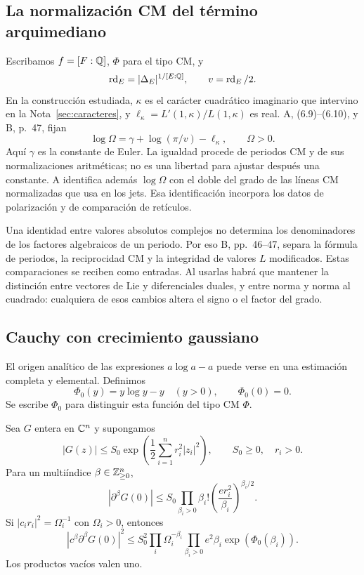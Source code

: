 \subsection{La normalización CM del término arquimediano}

Escribamos $f=[F:\mathbb{Q}]$, $\Phi$ para el tipo CM, y
\[
 \operatorname{rd}_E=|\Delta_E|^{1/[E:\mathbb{Q}]},\qquad
 v=\operatorname{rd}_E/2.
\]
En la construcción estudiada, $\kappa$ es el carácter cuadrático
imaginario que intervino en la Nota~\ref{sec:caracteres}, y
$\ell_\kappa=L'(1,\kappa)/L(1,\kappa)$ es real. A, (6.9)--(6.10),
y B, p.~47, fijan
\begin{equation}
 \log\Omega=\gamma+\log(\pi/v)-\ell_\kappa,
 \qquad \Omega>0.
 \label{eq:periodos-cm}
\end{equation}
Aquí $\gamma$ es la constante de Euler. La igualdad procede de
periodos CM y de sus normalizaciones aritméticas; no es una libertad
para ajustar después una constante. A identifica además
$\log\Omega$ con el doble del grado de las líneas CM normalizadas
que usa en los jets. Esa identificación incorpora los datos de
polarización y de comparación de retículos.

Una identidad entre valores absolutos complejos no determina los
denominadores de los factores algebraicos de un periodo. Por eso B,
pp.~46--47, separa la fórmula de periodos, la reciprocidad CM y la
integridad de valores $L$ modificados. Estas comparaciones se reciben
como entradas. Al usarlas habrá que mantener la distinción entre
vectores de Lie y diferenciales duales, y entre norma y norma al
cuadrado: cualquiera de esos cambios altera el signo o el factor
del grado.

\subsection{Cauchy con crecimiento gaussiano}

El origen analítico de las expresiones $a\log a-a$ puede verse en
una estimación completa y elemental. Definimos
\[
 \Phi_0(y)=y\log y-y\quad(y>0),\qquad \Phi_0(0)=0.
\]
Se escribe $\Phi_0$ para distinguir esta función del tipo CM $\Phi$.

\begin{lema}
Sea $G$ entera en $\mathbb{C}^n$ y supongamos
\[
 |G(z)|\le S_0\exp\left(\frac12\sum_{i=1}^n r_i^2|z_i|^2\right),
 \qquad S_0\ge0,\quad r_i>0.
\]
Para un multiíndice $\beta\in\mathbb{Z}_{\ge0}^n$,
\begin{equation}
 |\partial^\beta G(0)|
 \le S_0\prod_{\beta_i>0}
         \beta_i!\left(\frac{e r_i^2}{\beta_i}\right)^{\beta_i/2}.
 \label{eq:periodos-cauchy}
\end{equation}
Si $|c_ir_i|^2=\Omega_i^{-1}$ con $\Omega_i>0$, entonces
\begin{equation}
 |c^\beta\partial^\beta G(0)|^2
 \le S_0^2\prod_i\Omega_i^{-\beta_i}
       \prod_{\beta_i>0} e^2\beta_i\exp(\Phi_0(\beta_i)).
 \label{eq:periodos-cauchy-periodo}
\end{equation}
Los productos vacíos valen uno.
\label{lem:periodos-cauchy}
\end{lema}


